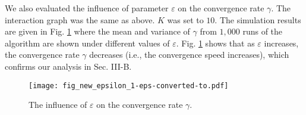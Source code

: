 \documentclass{IEEEtran}
\begin{document}
We also evaluated the influence of parameter $\varepsilon$ on the convergence rate $\gamma$. The interaction graph was the same as above. $K$ was set to $10$. The simulation results are given in Fig. \ref{figure_epsilon_rho} where the mean and variance of $\gamma$ from $1,000$ runs of the algorithm are shown under different values of $\varepsilon$. Fig. \ref{figure_epsilon_rho} shows that as $\varepsilon$ increases, the convergence rate $\gamma$ decreases (i.e., the convergence speed increases), which confirms our analysis in Sec. III-B.

\begin{figure}[h]
	\begin{center}
		\texttt{[image: fig\_new\_epsilon\_1-eps-converted-to.pdf]}
	\end{center}
	\caption{The influence of $\varepsilon$ on the convergence rate $\gamma$.}
	\label{figure_epsilon_rho}
\end{figure}
\end{document}

